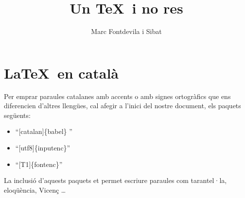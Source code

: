 \documentclass[a4paper,12pt]{book}
\begin{document}
\title{Un \TeX \ i no res }
\author{Marc Fontdevila i Sibat}
\maketitle
\chapter{\LaTeX \ en català}
Per emprar paraules catalanes amb accents o amb signes ortogràfics que ens diferencien d’altres llengües, cal afegir a l’inici del nostre document, els paquets següents:
\begin{itemize}
\item “[catalan]\{babel\} ”
\item “[utf8]\{inputenc\}”
\item “[T1]\{fontenc\}”
\end{itemize}

La inclusió d’aquests paquets et permet escriure paraules com tarantel·la, eloqüència, Vicenç \ldots
\end{document}
